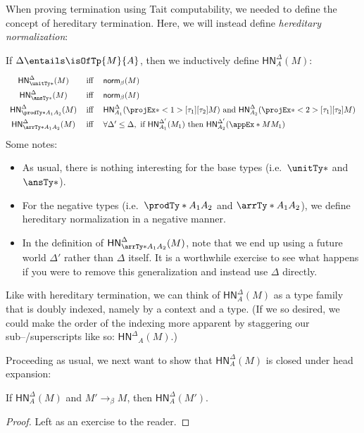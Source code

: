 \documentclass[letterpaper]{article}
\newcommand{\De}[0]{\Delta}
\newcommand{\betaReducesTo}[0]{\to_\beta}
\newcommand{\betaNorm}[1]{\mathsf{norm}_\beta(#1)}
\newcommand{\HN}[3]{\mathsf{HN}^{#1}_{#2}(#3)}
\begin{document}
When proving termination using Tait computability, we needed to define the
concept of hereditary termination. Here, we will instead define \emph{hereditary
normalization}:
\begin{definition}
If $\De \entails \isOfTp{M}{A}$, then we inductively define $\HN{\De}{A}{M}$:
\[
\renewcommand{\arraystretch}{1.5}
\begin{array}{cll}
  \HN{\De}{\unitTy*}{M} & \Iff &
    \betaNorm{M} \\
  \HN{\De}{\ansTy*}{M} & \Iff &
    \betaNorm{M} \\
  \HN{\De}{\prodTy*{A_1}{A_2}}{M} & \Iff &
    \HN{\De}{A_1}{\fstEx*{M}} \textrm{ and } \HN{\De}{A_2}{\sndEx*{M}} \\
  \HN{\De}{\arrTy*{A_1}{A_2}}{M} & \Iff &
    \forall \De' \leq \De, \textrm{ if } \HN{\De'}{A_1}{M_1} \textrm{ then } \HN{\De'}{A_2}{\appEx*{M}{M_1}}
\end{array}
\]
Some notes:
\begin{itemize}
  \item As usual, there is nothing interesting for the base types (i.e.\
    $\unitTy*$ and $\ansTy*$).
  \item For the negative types (i.e.\ $\prodTy*{A_1}{A_2}$ and
    $\arrTy*{A_1}{A_2}$), we define hereditary normalization in a negative manner.
  \item In the definition of $\HN{\De}{\arrTy*{A_1}{A_2}}{M}$, note that we end
    up using a future world $\De'$ rather than $\De$ itself. It is a worthwhile
    exercise to see what happens if you were to remove this generalization and
    instead use $\De$ directly.
\end{itemize}
\end{definition}

Like with hereditary termination, we can think of $\HN{\De}{A}{M}$ as a type
family that is doubly indexed, namely by a context and a type. (If we so
desired, we could make the order of the indexing more apparent by staggering our
sub–/superscripts like so: ${\mathsf{HN}^\De}_A(M)$.)

Proceeding as usual, we next want to show that $\HN{\De}{A}{M}$ is closed under
head expansion:
\begin{lemma}
If $\HN{\De}{A}{M}$ and $M' \betaReducesTo M$, then $\HN{\De}{A}{M'}$.
\end{lemma}
\begin{proof}
Left as an exercise to the reader.
\end{proof}
\end{document}

